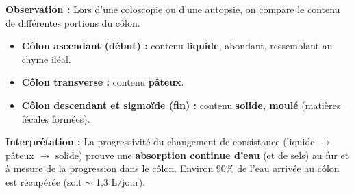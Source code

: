 \documentclass[11pt]{article}
\begin{document}
\begin{experience}
\textbf{Observation :} Lors d'une coloscopie ou d'une autopsie, on compare le contenu de différentes portions du côlon.
\begin{itemize}
    \item \textbf{Côlon ascendant (début) :} contenu \textbf{liquide}, abondant, ressemblant au chyme iléal.
    \item \textbf{Côlon transverse :} contenu \textbf{pâteux}.
    \item \textbf{Côlon descendant et sigmoïde (fin) :} contenu \textbf{solide, moulé} (matières fécales formées).
\end{itemize}
\textbf{Interprétation :} La progressivité du changement de consistance (liquide $\rightarrow$ pâteux $\rightarrow$ solide) prouve une \textbf{absorption continue d'eau} (et de sels) au fur et à mesure de la progression dans le côlon. Environ 90\% de l'eau arrivée au côlon est récupérée (soit $\sim$ 1,3 L/jour).
\end{experience}
\end{document}
